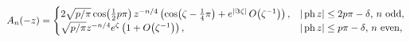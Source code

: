 \[\mathop{A_{n}\/}\nolimits\!\left(-z\right)=\begin{cases}2\sqrt{p/\pi}\mathop{%
\cos\/}\nolimits\!\left(\tfrac{1}{2}p\pi\right)z^{-n/4}\left(\mathop{\cos\/}%
\nolimits\!\left(\zeta-\tfrac{1}{4}\pi\right)+e^{|\Im\zeta|}\mathop{O\/}%
\nolimits\!\left(\zeta^{-1}\right)\right),&\text{$|\mathop{\mathrm{ph}\/}%
\nolimits z|\leq 2p\pi-\delta$, $n$ odd},\\
\sqrt{p/\pi}z^{-n/4}e^{\zeta}\left(1+\mathop{O\/}\nolimits\!\left(\zeta^{-1}%
\right)\right),&\text{$|\mathop{\mathrm{ph}\/}\nolimits z|\leq p\pi-\delta$, $%
n$ even},\end{cases}\]